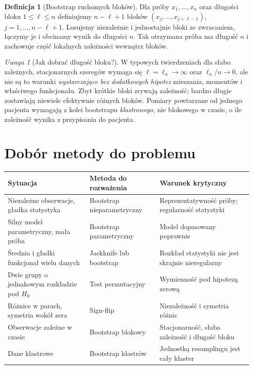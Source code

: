 \documentclass[11pt,a4paper,oneside]{report}
\numberwithin{equation}{chapter}
\theoremstyle{plain}
\theoremstyle{definition}
\newtheorem{definicja}{Definicja}[chapter]
\theoremstyle{remark}
\newtheorem{uwaga}{Uwaga}[chapter]
\begin{document}
\begin{definicja}[Bootstrap ruchomych bloków]
Dla próby $x_1,\ldots,x_n$ oraz długości bloku
$1\le\ell\le n$ definiujemy $n-\ell+1$ bloków
$(x_j,\ldots,x_{j+\ell-1})$, $j=1,\ldots,n-\ell+1$.
Losujemy niezależnie i jednostajnie bloki ze zwracaniem,
łączymy je i obcinamy wynik do długości $n$.
Tak otrzymana próba ma długość $n$ i zachowuje
część lokalnych zależności wewnątrz bloków.
\end{definicja}

\begin{uwaga}[Jak dobrać długość bloku?]
W typowych twierdzeniach dla słabo zależnych,
stacjonarnych szeregów wymaga się
$\ell=\ell_n\to\infty$ oraz $\ell_n/n\to0$,
ale nie są to warunki \emph{wystarczające bez dodatkowych
hipotez} mieszania, momentów i właściwego funkcjonału.
Zbyt krótkie bloki zrywają zależność; bardzo długie
zostawiają niewiele efektywnie różnych bloków.
Pomiary powtarzane od jednego pacjenta wymagają z kolei
bootstrapu \emph{klastrowego}, nie blokowego w czasie,
o ile zależność wynika z przypisania do pacjenta.
\end{uwaga}

\section{Dobór metody do problemu}
\begin{center}\small
\begin{tabular}{>{\raggedright\arraybackslash}p{}>{\raggedright\arraybackslash}p{}>{\raggedright\arraybackslash}p{}}
\toprule
\textbf{Sytuacja} & \textbf{Metoda do rozważenia} & \textbf{Warunek krytyczny}\\
\midrule
Niezależne obserwacje, gładka statystyka & Bootstrap nieparametryczny & Reprezentatywność próby; regularność statystyki\\
Silny model parametryczny, mała próba & Bootstrap parametryczny & Model dopasowany poprawnie\\
Średnia i gładki funkcjonał wielu danych & Jackknife lub bootstrap & Rozkład statystyki nie jest skrajnie nieregularny\\
Dwie grupy o jednakowym rozkładzie pod $H_0$ & Test permutacyjny & Wymienność pod hipotezą zerową\\
Różnice w parach, symetria wokół zera & Sign-flip & Niezależność i symetria różnic\\
Obserwacje zależne w czasie & Bootstrap blokowy & Stacjonarność, słaba zależność i długość bloku\\
Dane klastrowe & Bootstrap klastrów & Jednostką resamplingu jest cały klaster\\
\bottomrule
\end{tabular}
\end{center}
\end{document}
